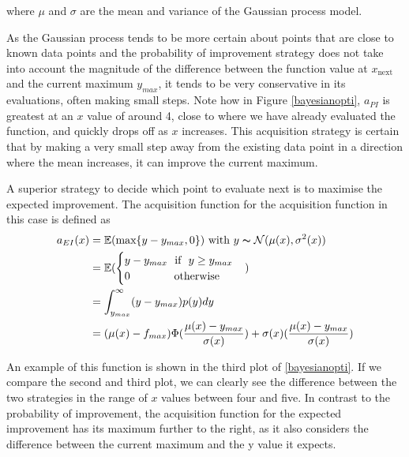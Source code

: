 \documentclass[a4paper,12pt,twoside,openright]{report}
\begin{document}
where $\mu$ and $\sigma$ are the mean and variance of the Gaussian process model.

As the Gaussian process tends to be more certain about points that are close to known data points and the probability of improvement strategy does not take into account the magnitude of the difference between the function value at $x_{\text{next}}$ and the current maximum $y_{max}$, it tends to be very conservative in its evaluations, often making small steps. Note how in Figure \ref{bayesianopti}, $a_{PI}$ is greatest at an $x$ value of around 4, close to where we have already evaluated the function, and quickly drops off as $x$ increases. This acquisition strategy is certain that by making a very small step away from the existing data point in a direction where the mean increases, it can improve the current maximum.

A superior strategy to decide which point to evaluate next is to maximise the expected improvement. The acquisition function for the acquisition function in this case is defined \cite{eipaper} as
\begin{align}
a_{EI}(x) &= \mathbb{E}(\text{max}\{y - y_{max}, 0\}) \text{\ with\ } y \thicksim \mathcal{N}(\mu(x),\sigma^2(x))\\
&= \mathbb{E}(\begin{cases}
        y-y_{max} \text{\ \ if\ \ } y \geq y_{max}
        \\
        0 \text{\ \ \ \ \ \ \ \ \ \ \ \ otherwise}
        \end{cases})\\
&= \int_{y_{max}}^\infty (y-y_{max})p(y)dy\\
&= (\mu(x) - f_{max})\Phi(\frac{\mu(x) - y_{max}}{\sigma(x)}) + \sigma(x)(\frac{\mu(x) - y_{max}}{\sigma(x)})
\end{align}

An example of this function is shown in the third plot of \ref{bayesianopti}. If we compare the second and third plot, we can clearly see the difference between the two strategies in the range of $x$ values between four and five. In contrast to the probability of improvement, the acquisition function for the expected improvement has its maximum further to the right, as it also considers the difference between the current maximum and the y value it expects.
\end{document}
